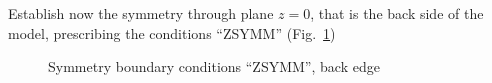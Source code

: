 \documentclass[english,a4paper,12pt]{article}
\begin{document}
Establish now the symmetry through plane $z=0$, that is the back side of the model, prescribing the conditions ``ZSYMM'' (Fig.~\ref{fig:zsymm})
\begin{figure}[h!tp]
\centering
{}
\caption{Symmetry boundary conditions ``ZSYMM'', back edge}
\label{fig:zsymm}
\end{figure}
\end{document}
